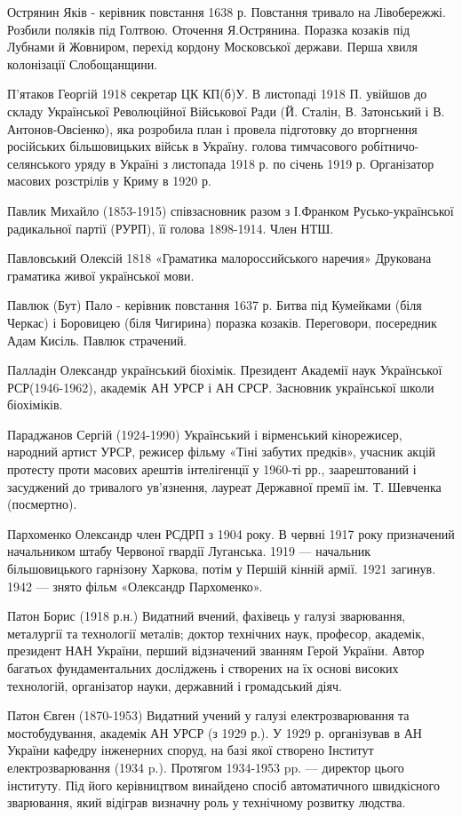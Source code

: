 Острянин Яків  - керівник повстання 1638 р. Повстання тривало на Лівобережжі. Розбили поляків під Голтвою. Оточення Я.Острянина. Поразка козаків під Лубнами й Жовниром, перехід кордону Московської держави. Перша хвиля колонізації Слобощанщини.

П’ятаков Георгій 1918  секретар ЦК КП(б)У. В листопаді 1918 П. увійшов до складу Української Революційної Військової Ради (Й. Сталін, В. Затонський і В. Антонов-Овсіенко), яка розробила план і провела підготовку до вторгнення російських більшовицьких військ в Україну. голова тимчасового робітничо-селянського уряду в Україні з листопада 1918 р. по січень 1919 р. Організатор масових розстрілів у Криму в 1920 р. 

Павлик Михайло (1853-1915)  співзасновник разом з І.Франком Русько-української радикальної партії (РУРП), її голова 1898-1914. Член НТШ. 

Павловський Олексій 1818 «Граматика малороссийського наречия» Друкована граматика живої української мови.

Павлюк (Бут) Пало  - керівник повстання 1637 р. Битва під Кумейками (біля Черкас) і Боровицею (біля Чигирина) поразка козаків. Переговори, посередник Адам Кисіль. Павлюк страчений.

Палладін Олександр український біохімік. Президент Академії наук Української РСР(1946-1962), академік АН УРСР і АН СРСР. Засновник української школи біохіміків. 

Параджанов Сергій (1924-1990) Український і вірменський кінорежисер, народний артист УРСР, режисер фільму «Тіні забутих предків», учасник акцій протесту проти масових арештів інтелігенції у 1960-ті рр., заарештований і засуджений до тривалого ув’язнення, лауреат Державної премії ім. Т. Шевченка (посмертно).

Пархоменко Олександр член РСДРП з 1904 року. В червні 1917 року призначений начальником штабу Червоної гвардії Луганська. 1919 --- начальник більшовицького гарнізону Харкова, потім у Першій кінній армії. 1921 загинув. 1942 --- знято фільм «Олександр Пархоменко».

Патон Борис (1918 р.н.) Видатний вчений, фахівець у галузі зварювання, металургії та технології металів; доктор технічних наук, професор, академік, президент НАН України, перший відзначений званням Герой України. Автор багатьох фундаментальних досліджень і створених на їх основі високих технологій, організатор науки, державний і громадський діяч.

Патон Євген (1870-1953) Видатний учений у галузі електрозварювання та мостобудування, академік АН УРСР (з 1929 р.). У 1929 р. організував в АН України кафедру інженерних споруд, на базі якої створено Інститут електрозварювання (1934 p.). Протягом 1934-1953 pp. --- директор цього інституту. Під його керівництвом винайдено спосіб автоматичного швидкісного зварювання, який відіграв визначну роль у технічному розвитку людства.

